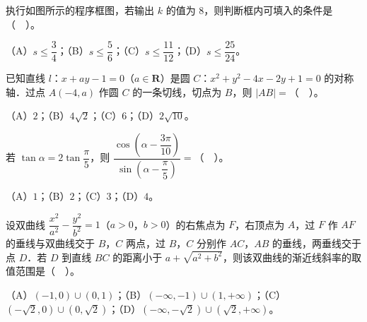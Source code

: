 \begin{question}
执行如图所示的程序框图，若输出 $k$ 的值为 $8$，则判断框内可填入的条件是（　）。
\nopagebreak[4]
\begin{center}\end{center}
\nopagebreak[4]
（A）$s\le\dfrac{3}{4}$；（B）$s\le\dfrac{5}{6}$；（C）$s\le\dfrac{11}{12}$；（D）$s\le\dfrac{25}{24}$。

\end{question}
\begin{question}
已知直线 $l$：$x+ay-1=0$（$a\in\mathbf{R}$）是圆 $C$：$x^{2}+y^{2}-4x-2y+1=0$ 的对称轴．过点 $A(-4,a)$ 作圆 $C$ 的一条切线，切点为 $B$，则 $|AB|=$（　）。

（A）$2$；（B）$4\sqrt{2}$；（C）$6$；（D）$2\sqrt{10}$。

\end{question}
\begin{question}
若 $\tan\alpha=2\tan\dfrac{\pi}{5}$，则 $\dfrac{\cos\left(\alpha-\dfrac{3\pi}{10}\right)}{\sin\left(\alpha-\dfrac{\pi}{5}\right)}=$（　）。

（A）$1$；（B）$2$；（C）$3$；（D）$4$。

\end{question}
\begin{question}
设双曲线 $\dfrac{x^{2}}{a^{2}}-\dfrac{y^{2}}{b^{2}}=1$（$a>0$，$b>0$）的右焦点为 $F$，右顶点为 $A$，过 $F$ 作 $AF$ 的垂线与双曲线交于 $B$，$C$ 两点，过 $B$，$C$ 分别作 $AC$，$AB$ 的垂线，两垂线交于点 $D$．若 $D$ 到直线 $BC$ 的距离小于 $a+\sqrt{a^{2}+b^{2}}$，则该双曲线的渐近线斜率的取值范围是（　）。

（A）$(-1,0)\cup(0,1)$；（B）$(-\infty,-1)\cup(1,+\infty)$；（C）$(-\sqrt{2},0)\cup(0,\sqrt{2})$；（D）$(-\infty,-\sqrt{2})\cup(\sqrt{2},+\infty)$。

\end{question}

